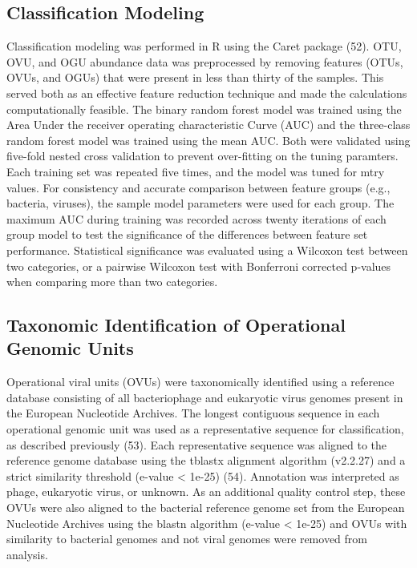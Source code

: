 \documentclass[12pt,]{article}
\begin{document}
\subsection{Classification Modeling}\label{classification-modeling}

Classification modeling was performed in R using the Caret package (52).
OTU, OVU, and OGU abundance data was preprocessed by removing features
(OTUs, OVUs, and OGUs) that were present in less than thirty of the
samples. This served both as an effective feature reduction technique
and made the calculations computationally feasible. The binary random
forest model was trained using the Area Under the receiver operating
characteristic Curve (AUC) and the three-class random forest model was
trained using the mean AUC. Both were validated using five-fold nested
cross validation to prevent over-fitting on the tuning paramters. Each
training set was repeated five times, and the model was tuned for mtry
values. For consistency and accurate comparison between feature groups
(e.g., bacteria, viruses), the sample model parameters were used for
each group. The maximum AUC during training was recorded across twenty
iterations of each group model to test the significance of the
differences between feature set performance. Statistical significance
was evaluated using a Wilcoxon test between two categories, or a
pairwise Wilcoxon test with Bonferroni corrected p-values when comparing
more than two categories.

\subsection{Taxonomic Identification of Operational Genomic
Units}\label{taxonomic-identification-of-operational-genomic-units}

Operational viral units (OVUs) were taxonomically identified using a
reference database consisting of all bacteriophage and eukaryotic virus
genomes present in the European Nucleotide Archives. The longest
contiguous sequence in each operational genomic unit was used as a
representative sequence for classification, as described previously
(53). Each representative sequence was aligned to the reference genome
database using the tblastx alignment algorithm (v2.2.27) and a strict
similarity threshold (e-value \textless{} 1e-25) (54). Annotation was
interpreted as phage, eukaryotic virus, or unknown. As an additional
quality control step, these OVUs were also aligned to the bacterial
reference genome set from the European Nucleotide Archives using the
blastn algorithm (e-value \textless{} 1e-25) and OVUs with similarity to
bacterial genomes and not viral genomes were removed from analysis.
\end{document}
